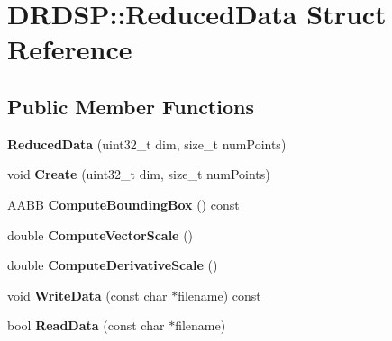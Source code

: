 \hypertarget{struct_d_r_d_s_p_1_1_reduced_data}{\section{D\-R\-D\-S\-P\-:\-:Reduced\-Data Struct Reference}
\label{struct_d_r_d_s_p_1_1_reduced_data}
}
\subsection*{Public Member Functions}
\begin{DoxyCompactItemize}
\item 
\hypertarget{struct_d_r_d_s_p_1_1_reduced_data_a8f35a3fffafac8f425b42094dbd0f855}{{\bfseries Reduced\-Data} (uint32\-\_\-t dim, size\-\_\-t num\-Points)}\label{struct_d_r_d_s_p_1_1_reduced_data_a8f35a3fffafac8f425b42094dbd0f855}

\item 
\hypertarget{struct_d_r_d_s_p_1_1_reduced_data_a7dbdf538537a79f996da1229f442441f}{void {\bfseries Create} (uint32\-\_\-t dim, size\-\_\-t num\-Points)}\label{struct_d_r_d_s_p_1_1_reduced_data_a7dbdf538537a79f996da1229f442441f}

\item 
\hypertarget{struct_d_r_d_s_p_1_1_reduced_data_ae8d15e5d1a61ed5e495112e4941b9ecb}{\hyperlink{struct_d_r_d_s_p_1_1_a_a_b_b}{A\-A\-B\-B} {\bfseries Compute\-Bounding\-Box} () const }\label{struct_d_r_d_s_p_1_1_reduced_data_ae8d15e5d1a61ed5e495112e4941b9ecb}

\item 
\hypertarget{struct_d_r_d_s_p_1_1_reduced_data_a603dadcceb2b793a76851ec687adad12}{double {\bfseries Compute\-Vector\-Scale} ()}\label{struct_d_r_d_s_p_1_1_reduced_data_a603dadcceb2b793a76851ec687adad12}

\item 
\hypertarget{struct_d_r_d_s_p_1_1_reduced_data_a6b5e802882a81572f3db17e5d1b0afa2}{double {\bfseries Compute\-Derivative\-Scale} ()}\label{struct_d_r_d_s_p_1_1_reduced_data_a6b5e802882a81572f3db17e5d1b0afa2}

\item 
\hypertarget{struct_d_r_d_s_p_1_1_reduced_data_a2eaa9d6f19f0c80998fb06c3f2ef4035}{void {\bfseries Write\-Data} (const char $\ast$filename) const }\label{struct_d_r_d_s_p_1_1_reduced_data_a2eaa9d6f19f0c80998fb06c3f2ef4035}

\item 
\hypertarget{struct_d_r_d_s_p_1_1_reduced_data_a0eedb12f1ca3d0775d10472f491fc72b}{bool {\bfseries Read\-Data} (const char $\ast$filename)}\label{struct_d_r_d_s_p_1_1_reduced_data_a0eedb12f1ca3d0775d10472f491fc72b}


\end{DoxyCompactItemize}
